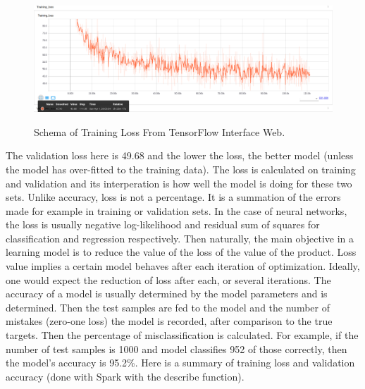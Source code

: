 \documentclass{acmtog} %
\begin{document}
\begin{figure}[H]
{\includegraphics[width=\linewidth]{training-loss.png}}
\caption{Schema of Training Loss From TensorFlow Interface Web.}
  \label{fig:archivedb}
\end{figure}


The validation loss here is 49.68 and the lower the loss, the better model (unless the model has over-fitted to the training data). The loss is calculated on training and validation and its interperation is how well the model is doing for these two sets. Unlike accuracy, loss is not a percentage. It is a summation of the errors made for example in training or validation sets.
In the case of neural networks, the loss is usually negative log-likelihood and residual sum of squares for classification and regression respectively. Then naturally, the main objective in a learning model is to reduce the value of the loss of the value of the product.
Loss value implies a certain model behaves after each iteration of optimization. Ideally, one would expect the reduction of loss after each, or several iterations.
The accuracy of a model is usually determined by the model parameters and is determined. Then the test samples are fed to the model and the number of mistakes (zero-one loss) the model is recorded, after comparison to the true targets. Then the percentage of misclassification is calculated.
For example, if the number of test samples is 1000 and model classifies 952 of those correctly, then the model's accuracy is 95.2\%.
Here is a summary of training loss and validation accuracy (done with Spark with the describe function).


\begin{table}[H]
\label{tab:training_loss_a}
\end{table}
\end{document}
